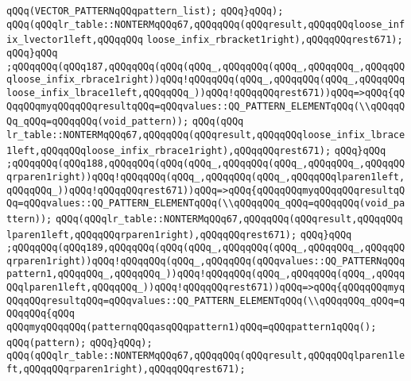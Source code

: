 \verb|qQQq(VECTOR_PATTERNqQQqpattern_list);|\newline
\verb|qQQq}qQQq);|\newline
\verb|qQQq(qQQqlr_table::NONTERMqQQq67,qQQqqQQq(qQQqresult,qQQqqQQqloose_infix_lvector1left,qQQqqQQq|\newline
\verb|loose_infix_rbracket1right),qQQqqQQqrest671);|\newline
\verb|qQQq}qQQq|\newline
\verb|;qQQqqQQq(qQQq187,qQQqqQQq(qQQq(qQQq_,qQQqqQQq(qQQq_,qQQqqQQq_,qQQqqQQqloose_infix_rbrace1right))qQQq!qQQqqQQq(qQQq_,qQQqqQQq(qQQq_,qQQqqQQqloose_infix_lbrace1left,qQQqqQQq_))qQQq!qQQqqQQqrest671))qQQq=>qQQq{qQQqqQQqmyqQQqqQQqresultqQQq=qQQqvalues::QQ_PATTERN_ELEMENTqQQq(\\qQQqqQQq_qQQq=qQQqqQQq(void_pattern));|\newline
\verb|qQQq(qQQq|\newline
\verb|lr_table::NONTERMqQQq67,qQQqqQQq(qQQqresult,qQQqqQQqloose_infix_lbrace1left,qQQqqQQqloose_infix_rbrace1right),qQQqqQQqrest671);|\newline
\verb|qQQq}qQQq|\newline
\verb|;qQQqqQQq(qQQq188,qQQqqQQq(qQQq(qQQq_,qQQqqQQq(qQQq_,qQQqqQQq_,qQQqqQQqrparen1right))qQQq!qQQqqQQq(qQQq_,qQQqqQQq(qQQq_,qQQqqQQqlparen1left,qQQqqQQq_))qQQq!qQQqqQQqrest671))qQQq=>qQQq{qQQqqQQqmyqQQqqQQqresultqQQq=qQQqvalues::QQ_PATTERN_ELEMENTqQQq(\\qQQqqQQq_qQQq=qQQqqQQq(void_pattern));|\newline
\verb|qQQq(qQQqlr_table::NONTERMqQQq67,qQQqqQQq(qQQqresult,qQQqqQQq|\newline
\verb|lparen1left,qQQqqQQqrparen1right),qQQqqQQqrest671);|\newline
\verb|qQQq}qQQq|\newline
\verb|;qQQqqQQq(qQQq189,qQQqqQQq(qQQq(qQQq_,qQQqqQQq(qQQq_,qQQqqQQq_,qQQqqQQqrparen1right))qQQq!qQQqqQQq(qQQq_,qQQqqQQq(qQQqvalues::QQ_PATTERNqQQqpattern1,qQQqqQQq_,qQQqqQQq_))qQQq!qQQqqQQq(qQQq_,qQQqqQQq(qQQq_,qQQqqQQqlparen1left,qQQqqQQq_))qQQq!qQQqqQQqrest671))qQQq=>qQQq{qQQqqQQqmyqQQqqQQqresultqQQq=qQQqvalues::QQ_PATTERN_ELEMENTqQQq(\\qQQqqQQq_qQQq=qQQqqQQq{qQQq|\newline
\verb|qQQqmyqQQqqQQq(patternqQQqasqQQqpattern1)qQQq=qQQqpattern1qQQq();|\newline
\verb|qQQq(pattern);|\newline
\verb|qQQq}qQQq);|\newline
\verb|qQQq(qQQqlr_table::NONTERMqQQq67,qQQqqQQq(qQQqresult,qQQqqQQqlparen1left,qQQqqQQqrparen1right),qQQqqQQqrest671);|\newline
